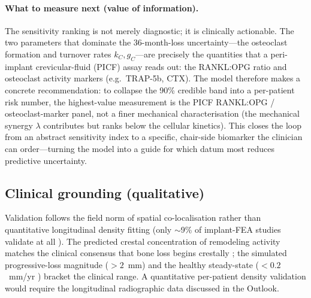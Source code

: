 \paragraph{What to measure next (value of information).} The sensitivity ranking is not merely
diagnostic; it is clinically actionable. The two parameters that dominate the 36-month-loss
uncertainty---the osteoclast formation and turnover rates $k_C,g_C$---are precisely the quantities
that a peri-implant crevicular-fluid (PICF) assay reads out: the RANKL:OPG ratio and osteoclast
activity markers (e.g.\ TRAP-5b, CTX). The model therefore makes a concrete recommendation: to
collapse the 90\% credible band into a per-patient risk number, the highest-value measurement is the
PICF RANKL:OPG / osteoclast-marker panel, not a finer mechanical characterisation (the mechanical
synergy $\lambda$ contributes but ranks below the cellular kinetics). This closes the loop from an
abstract sensitivity index to a specific, chair-side biomarker the clinician can order---turning the
model into a guide for which datum most reduces predictive uncertainty.

\subsection{Clinical grounding (qualitative)}
Validation follows the field norm of spatial co-localisation rather than quantitative longitudinal
density fitting (only $\sim$9\% of implant-FEA studies validate at all \citep{Chang2018}). The predicted
crestal concentration of remodeling activity matches the clinical consensus that bone loss begins
crestally \citep{Oh2002}; the simulated progressive-loss magnitude ($>\!2$~mm) and the healthy
steady-state ($<\!0.2$~mm/yr \citep{Albrektsson1986}) bracket the clinical range. A quantitative
per-patient density validation would require the longitudinal radiographic data discussed in the
Outlook.
